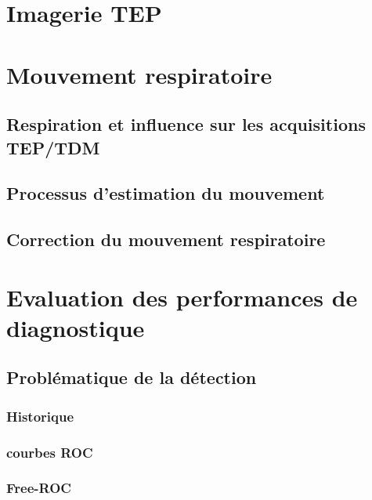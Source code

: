 \documentclass[12pt]{book}
\begin{document}
\part{Imagerie TEP}
		
			

\part{Mouvement respiratoire}
%	

	\chapter{Respiration et influence sur les acquisitions TEP/TDM}
	
	
	\chapter{Processus d'estimation du mouvement}
	
	
	\chapter{Correction du mouvement respiratoire}
	

\part{Evaluation des performances de diagnostique}
	\chapter{Problématique de la détection}
		\section{Historique}
		\section{courbes ROC}
		\section{Free-ROC}	
	
\end{document}
